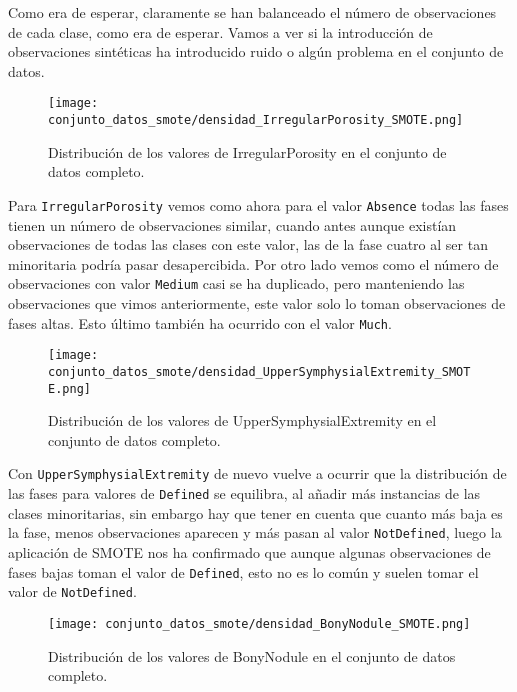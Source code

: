 Como era de esperar, claramente se han balanceado el número de observaciones de cada clase, como era de esperar. Vamos a ver si la introducción de observaciones sintéticas ha introducido ruido o algún problema en el conjunto de datos.


\begin{figure}[H]
	\centering
	\texttt{[image: conjunto\_datos\_smote/densidad\_IrregularPorosity\_SMOTE.png]}
	\caption{Distribución de los valores de IrregularPorosity en el conjunto de datos completo.}
	\label{fig:densidad_IrregularPorosity_SMOTE}
\end{figure}

Para \texttt{IrregularPorosity} vemos como ahora para el valor \texttt{Absence} todas las fases tienen un número de observaciones similar, cuando antes aunque existían observaciones de todas las clases con este valor, las de la fase cuatro al ser tan minoritaria podría pasar desapercibida. Por otro lado vemos como el número de observaciones con valor \texttt{Medium} casi se ha duplicado, pero manteniendo las observaciones que vimos anteriormente, este valor solo lo toman observaciones de fases altas. Esto último también ha ocurrido con el valor \texttt{Much}.

\begin{figure}[H]
	\centering
	\texttt{[image: conjunto\_datos\_smote/densidad\_UpperSymphysialExtremity\_SMOTE.png]}
	\caption{Distribución de los valores de UpperSymphysialExtremity en el conjunto de datos completo.}
	\label{fig:densidad_UpperSymphysialExtremity_SMOTE}
\end{figure}

Con \texttt{UpperSymphysialExtremity} de nuevo vuelve a ocurrir que la distribución de las fases para valores de \texttt{Defined} se equilibra, al añadir más instancias de las clases minoritarias, sin embargo hay que tener en cuenta que cuanto más baja es la fase, menos observaciones aparecen y más pasan al valor \texttt{NotDefined}, luego la aplicación de SMOTE nos ha confirmado que aunque algunas observaciones de fases bajas toman el valor de \texttt{Defined}, esto no es lo común y suelen tomar el valor de \texttt{NotDefined}.

\begin{figure}[H]
	\centering
	\texttt{[image: conjunto\_datos\_smote/densidad\_BonyNodule\_SMOTE.png]}
	\caption{Distribución de los valores de BonyNodule en el conjunto de datos completo.}
	\label{fig:densidad_BonyNodule_SMOTE}
\end{figure}


